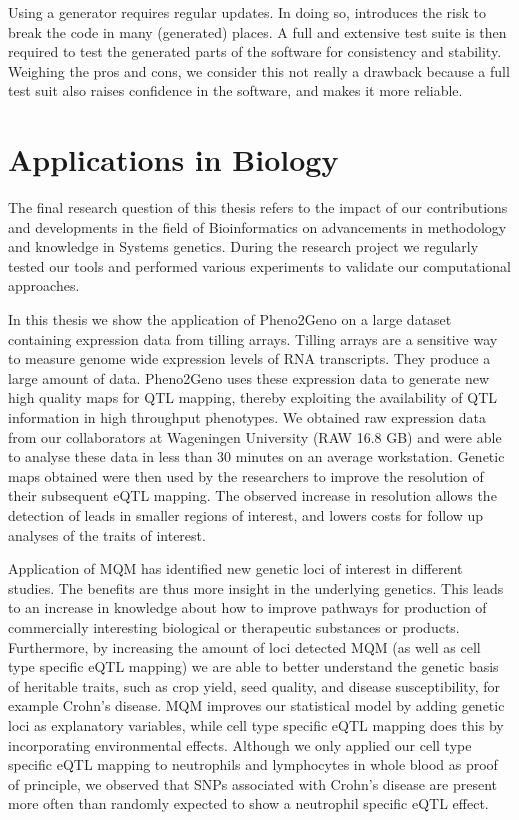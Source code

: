 Using a generator requires regular updates. In doing so, introduces the risk to break the code in many (generated) places. A full and extensive test 
suite is then required to test the generated parts of the software for consistency and stability. Weighing the pros and cons, we consider this not 
really a drawback because a full test suit also raises confidence in the software, and makes it more reliable. 

\section{Applications in Biology}
The final research question of this thesis refers to the impact of our contributions and developments  in the field of Bioinformatics on advancements 
in methodology and knowledge in Systems genetics. During the research project we regularly tested our tools and performed various experiments to 
validate our computational approaches. 

In this thesis we show the application of Pheno2Geno on a large dataset containing expression data from tilling arrays. Tilling arrays are a sensitive way to 
measure genome wide expression levels of RNA transcripts. They produce a large amount of data. Pheno2Geno uses these expression data to generate new high 
quality maps for QTL mapping, thereby exploiting the availability of QTL information in high throughput phenotypes. We obtained raw expression data from 
our collaborators at Wageningen University (RAW 16.8 GB) and were able to analyse these data in less than 30 minutes on an average workstation. Genetic 
maps obtained were then used by the researchers to improve the resolution of their subsequent eQTL mapping. The observed increase in resolution allows 
the detection of leads in smaller regions of interest, and lowers costs for follow up analyses of the traits of interest.

Application of MQM has identified new genetic loci of interest in different studies. The benefits are thus more insight in the underlying genetics. 
This leads to an increase in knowledge about how to improve pathways for production of commercially interesting biological or therapeutic substances 
or products. Furthermore, by increasing the amount of loci detected MQM (as well as cell type specific eQTL mapping) we are able to better understand 
the genetic basis of heritable traits, such as crop yield, seed quality, and disease susceptibility, for example Crohn's disease. MQM improves our 
statistical model by adding genetic loci as explanatory variables, while cell type specific eQTL mapping does this by incorporating environmental 
effects. Although we only applied our cell type specific eQTL mapping to neutrophils and lymphocytes in whole blood as proof of principle, we 
observed that SNPs associated with Crohn's disease are present more often than randomly expected to show a neutrophil specific eQTL effect.

